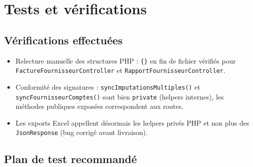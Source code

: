 \documentclass[11pt,a4paper]{article}
\begin{document}
\newpage

\section{Tests et vérifications}

\subsection{Vérifications effectuées}

\begin{itemize}[leftmargin=1.4em]
  \item Relecture manuelle des structures PHP : \texttt{\{\}} en fin de
    fichier vérifiés pour \texttt{FactureFournisseurController} et
    \texttt{RapportFournisseurController}.
  \item Conformité des signatures : \texttt{syncImputationsMultiples()} et
    \texttt{syncFournisseurComptes()} sont bien \texttt{private} (helpers
    internes), les méthodes publiques exposées correspondent aux routes.
  \item Les exports Excel appellent désormais les helpers privés PHP et
    non plus des \texttt{JsonResponse} (bug corrigé avant livraison).
\end{itemize}

\subsection{Plan de test recommandé}
\end{document}
